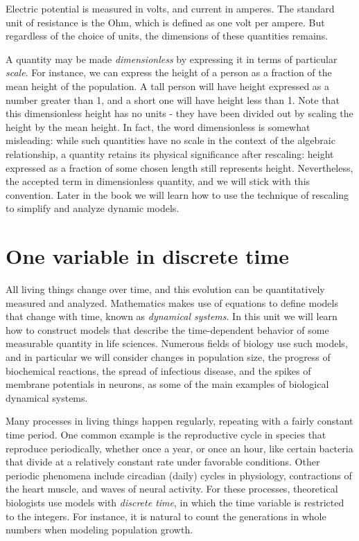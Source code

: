 \documentclass[
  letterpaper,
  DIV=11,
  numbers=noendperiod]{scrreprt}
\begin{document}
Electric potential is measured in volts, and current in amperes. The
standard unit of resistance is the Ohm, which is defined as one volt per
ampere. But regardless of the choice of units, the dimensions of these
quantities remains.

A quantity may be made \emph{dimensionless} by expressing it in terms of
particular \emph{scale}. For instance, we can express the height of a
person as a fraction of the mean height of the population. A tall person
will have height expressed as a number greater than 1, and a short one
will have height less than 1. Note that this dimensionless height has no
units - they have been divided out by scaling the height by the mean
height. In fact, the word dimensionless is somewhat misleading: while
such quantities have no scale in the context of the algebraic
relationship, a quantity retains its physical significance after
rescaling: height expressed as a fraction of some chosen length still
represents height. Nevertheless, the accepted term in dimensionless
quantity, and we will stick with this convention. Later in the book we
will learn how to use the technique of rescaling to simplify and analyze
dynamic models.


\hypertarget{one-variable-in-discrete-time}{%
\chapter{One variable in discrete
time}\label{one-variable-in-discrete-time}}

All living things change over time, and this evolution can be
quantitatively measured and analyzed. Mathematics makes use of equations
to define models that change with time, known as \emph{dynamical
systems}. In this unit we will learn how to construct models that
describe the time-dependent behavior of some measurable quantity in life
sciences. Numerous fields of biology use such models, and in particular
we will consider changes in population size, the progress of biochemical
reactions, the spread of infectious disease, and the spikes of membrane
potentials in neurons, as some of the main examples of biological
dynamical systems.

Many processes in living things happen regularly, repeating with a
fairly constant time period. One common example is the reproductive
cycle in species that reproduce periodically, whether once a year, or
once an hour, like certain bacteria that divide at a relatively constant
rate under favorable conditions. Other periodic phenomena include
circadian (daily) cycles in physiology, contractions of the heart
muscle, and waves of neural activity. For these processes, theoretical
biologists use models with \emph{discrete time}, in which the time
variable is restricted to the integers. For instance, it is natural to
count the generations in whole numbers when modeling population growth.
\end{document}
